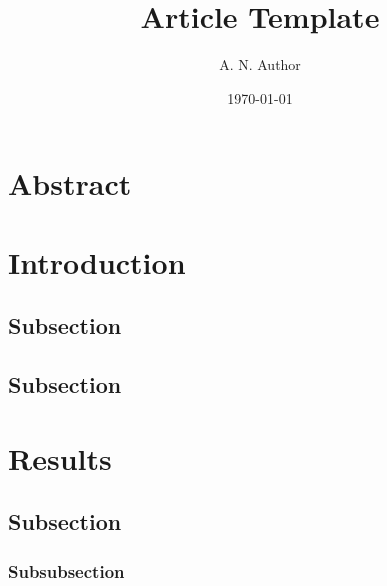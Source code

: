 \documentclass[a4paper, 11pt]{lt_article}
\title{Article Template}
\author{A. N. Author}
\date{\today}
\begin{document}
\maketitle

\section*{Abstract} %

\blindtext

\section{Introduction} %

\Blindtext[1]

\subsection{Subsection} %

\Blindtext[3]

\subsection{Subsection} %

\Blindtext[2]


\section{Results} %

\subsection{Subsection} %

\Blindtext[1]

\subsubsection{Subsubsection}
\Blindtext[2]
\end{document}

